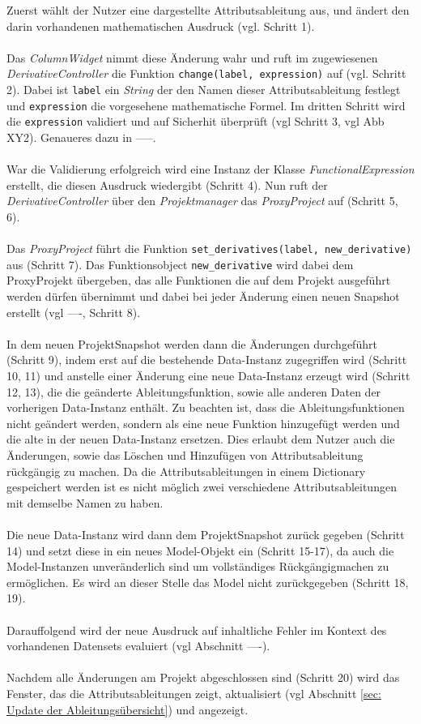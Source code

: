\documentclass{article}
\begin{document}
Zuerst wählt der Nutzer eine dargestellte Attributsableitung aus, und ändert den darin vorhandenen mathematischen Ausdruck (vgl. Schritt 1). \\\\Das \textit{ColumnWidget} nimmt diese Änderung wahr und ruft im zugewiesenen \textit{DerivativeController} die Funktion \texttt{change(label, expression)} auf (vgl. Schritt 2). Dabei ist \texttt{label} ein \textit{String} der den Namen dieser Attributsableitung festlegt und \texttt{expression} die vorgesehene mathematische Formel. Im dritten Schritt wird die \texttt{expression} validiert und auf Sicherhit überprüft (vgl Schritt 3, vgl Abb XY2). Genaueres dazu in -----. \\\\
War die Validierung erfolgreich wird eine Instanz der Klasse \textit{FunctionalExpression} erstellt, die diesen Ausdruck wiedergibt (Schritt 4). Nun ruft der \textit{DerivativeController} über den \textit{Projektmanager} das \textit{ProxyProject} auf (Schritt 5, 6).\\\\
Das \textit{ProxyProject} führt die Funktion \texttt{set\_derivatives(label, new\_derivative)} aus (Schritt 7). Das Funktionsobject \texttt{new\_derivative} wird dabei dem ProxyProjekt übergeben, das alle Funktionen die auf dem Projekt ausgeführt werden dürfen übernimmt und dabei bei jeder Änderung einen neuen Snapshot erstellt (vgl ----, Schritt 8).\\\\
In dem neuen ProjektSnapshot werden dann die Änderungen durchgeführt (Schritt 9), indem erst auf die bestehende Data-Instanz zugegriffen wird (Schritt 10, 11) und anstelle einer Änderung eine neue Data-Instanz erzeugt wird (Schritt 12, 13), die die geänderte Ableitungsfunktion, sowie alle anderen Daten der vorherigen Data-Instanz enthält. Zu beachten ist, dass die Ableitungsfunktionen nicht geändert werden, sondern als eine neue Funktion hinzugefügt werden und die alte in der neuen Data-Instanz ersetzen. Dies erlaubt dem Nutzer auch die Änderungen, sowie das Löschen und Hinzufügen von Attributsableitung rückgängig zu machen. Da die Attributsableitungen in einem Dictionary gespeichert werden ist es nicht möglich zwei verschiedene Attributsableitungen mit demselbe Namen zu haben.\\\\
Die neue Data-Instanz wird dann dem ProjektSnapshot zurück gegeben (Schritt 14) und setzt diese in ein neues Model-Objekt ein (Schritt 15-17), da auch die Model-Instanzen unveränderlich sind um vollständiges Rückgängigmachen zu ermöglichen. Es wird an dieser Stelle das Model nicht zurückgegeben (Schritt 18, 19).\\\\
Darauffolgend wird der neue Ausdruck auf inhaltliche Fehler im Kontext des vorhandenen Datensets evaluiert (vgl Abschnitt ----).\\\\
Nachdem alle Änderungen am Projekt abgeschlossen sind (Schritt 20) wird das Fenster, das die Attributsableitungen zeigt, aktualisiert (vgl Abschnitt \ref{sec: Update der Ableitungsübersicht}) und angezeigt.
\end{document}
